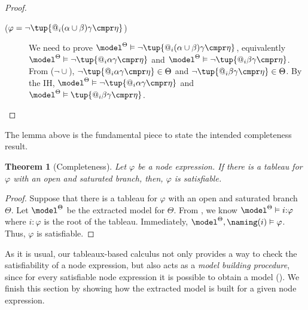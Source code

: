 \documentclass[10pt,a4paper]{amsart}
\newtheorem{thm}{Theorem}[section]
\theoremstyle{definition}
\theoremstyle{remark}
\begin{document}
\begin{proof}
\begin{description}
\begin{description}
            \item[($\varphi = \lnot\tup{@_i(\alpha \cup \beta) \gamma \cmpr \eta}$)]
                We need to prove  $\model^\Theta \vDash \lnot\tup{@_i (\alpha \cup \beta) \gamma \cmpr \eta}$, equivalently $\model^\Theta \vDash \lnot\tup{@_i\alpha\gamma \cmpr \eta}$ and $\model^\Theta \vDash \lnot\tup{@_i \beta\gamma \cmpr \eta}$.
                From (${\lnot}{\cup}$), $\lnot\tup{@_i\alpha\gamma \cmpr \eta} \in \Theta$ and $\lnot\tup{@_i\beta\gamma \cmpr \eta} \in \Theta$.
                By the IH, $\model^{\Theta} \vDash \lnot\tup{@_i\alpha\gamma \cmpr \eta}$ and $\model^{\Theta} \vDash \tup{@_i\beta\gamma \cmpr \eta}$.
        \end{description}

    \end{description}
\end{proof}

The lemma above is the fundamental piece to state the intended completeness result.


\begin{thm}[Completeness]
    Let $\varphi$ be a node expression.
    If there is a tableau for $\varphi$ with an open and saturated branch, then, $\varphi$ is satisfiable.
\end{thm}

\begin{proof}
    Suppose that there is a tableau for $\varphi$ with an open and saturated branch $\Theta$.
    Let $\model^{\Theta}$ be the extracted model for $\Theta$.
    From , we know $\model^{\Theta} \vDash i{:}\varphi$ where $i{:}\varphi$ is the root of the tableau.
    Immediately, $\model^{\Theta}, \naming(i) \vDash \varphi$.
    Thus, $\varphi$ is satisfiable.
\end{proof}


As it is usual, our tableaux-based calculus not only provides a way to check the satisfiability of a node expression, but also acts as a \emph{model building procedure}, since for every satisfiable node expression it is possible to obtain a model (). 
We finish this section by showing how the extracted model is built for a given node expression.
\end{document}
